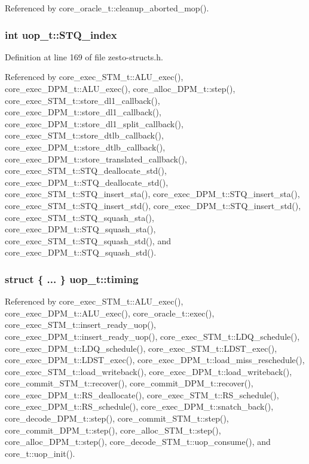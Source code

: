 Referenced by core\_\-oracle\_\-t::cleanup\_\-aborted\_\-mop().
\subsubsection[{STQ\_\-index}]{\setlength{\rightskip}{0pt plus 5cm}int {\bf uop\_\-t::STQ\_\-index}}\label{structuop__t_d7c02fea6ab96a3296267fbc7d83d5f2}




Definition at line 169 of file zesto-structs.h.

Referenced by core\_\-exec\_\-STM\_\-t::ALU\_\-exec(), core\_\-exec\_\-DPM\_\-t::ALU\_\-exec(), core\_\-alloc\_\-DPM\_\-t::step(), core\_\-exec\_\-STM\_\-t::store\_\-dl1\_\-callback(), core\_\-exec\_\-DPM\_\-t::store\_\-dl1\_\-callback(), core\_\-exec\_\-DPM\_\-t::store\_\-dl1\_\-split\_\-callback(), core\_\-exec\_\-STM\_\-t::store\_\-dtlb\_\-callback(), core\_\-exec\_\-DPM\_\-t::store\_\-dtlb\_\-callback(), core\_\-exec\_\-DPM\_\-t::store\_\-translated\_\-callback(), core\_\-exec\_\-STM\_\-t::STQ\_\-deallocate\_\-std(), core\_\-exec\_\-DPM\_\-t::STQ\_\-deallocate\_\-std(), core\_\-exec\_\-STM\_\-t::STQ\_\-insert\_\-sta(), core\_\-exec\_\-DPM\_\-t::STQ\_\-insert\_\-sta(), core\_\-exec\_\-STM\_\-t::STQ\_\-insert\_\-std(), core\_\-exec\_\-DPM\_\-t::STQ\_\-insert\_\-std(), core\_\-exec\_\-STM\_\-t::STQ\_\-squash\_\-sta(), core\_\-exec\_\-DPM\_\-t::STQ\_\-squash\_\-sta(), core\_\-exec\_\-STM\_\-t::STQ\_\-squash\_\-std(), and core\_\-exec\_\-DPM\_\-t::STQ\_\-squash\_\-std().
\subsubsection[{timing}]{\setlength{\rightskip}{0pt plus 5cm}struct \{ ... \}   {\bf uop\_\-t::timing}}\label{structuop__t_b61a7ea0dc1ac39e3e55da42e98454f0}




Referenced by core\_\-exec\_\-STM\_\-t::ALU\_\-exec(), core\_\-exec\_\-DPM\_\-t::ALU\_\-exec(), core\_\-oracle\_\-t::exec(), core\_\-exec\_\-STM\_\-t::insert\_\-ready\_\-uop(), core\_\-exec\_\-DPM\_\-t::insert\_\-ready\_\-uop(), core\_\-exec\_\-STM\_\-t::LDQ\_\-schedule(), core\_\-exec\_\-DPM\_\-t::LDQ\_\-schedule(), core\_\-exec\_\-STM\_\-t::LDST\_\-exec(), core\_\-exec\_\-DPM\_\-t::LDST\_\-exec(), core\_\-exec\_\-DPM\_\-t::load\_\-miss\_\-reschedule(), core\_\-exec\_\-STM\_\-t::load\_\-writeback(), core\_\-exec\_\-DPM\_\-t::load\_\-writeback(), core\_\-commit\_\-STM\_\-t::recover(), core\_\-commit\_\-DPM\_\-t::recover(), core\_\-exec\_\-DPM\_\-t::RS\_\-deallocate(), core\_\-exec\_\-STM\_\-t::RS\_\-schedule(), core\_\-exec\_\-DPM\_\-t::RS\_\-schedule(), core\_\-exec\_\-DPM\_\-t::snatch\_\-back(), core\_\-decode\_\-DPM\_\-t::step(), core\_\-commit\_\-STM\_\-t::step(), core\_\-commit\_\-DPM\_\-t::step(), core\_\-alloc\_\-STM\_\-t::step(), core\_\-alloc\_\-DPM\_\-t::step(), core\_\-decode\_\-STM\_\-t::uop\_\-consume(), and core\_\-t::uop\_\-init().
